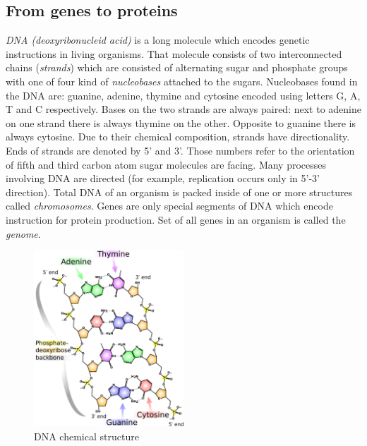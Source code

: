 \documentclass[times, utf8, diplomski]{fer}
\begin{document}
\subsection{From genes to proteins}

\emph{DNA (deoxyribonucleid acid)} is a long molecule which encodes genetic instructions in living organisms. That molecule consists of two interconnected chains (\emph{strands}) which are consisted of alternating sugar and phosphate groups with one of four kind of \emph{nucleobases} attached to the sugars. Nucleobases found in the DNA are: guanine, adenine, thymine and cytosine encoded using letters G, A, T and C respectively. Bases on the two strands are always paired: next to adenine on one strand there is always thymine on the other. Opposite to guanine there is always cytosine. Due to their chemical composition, strands have directionality. Ends of strands are denoted by 5' and 3'. Those numbers refer to the orientation of fifth and third carbon atom sugar molecules are facing. Many processes involving DNA are directed (for example, replication occurs only in 5'-3' direction). Total DNA of an organism is packed inside of one or more structures called \emph{chromosomes}. Genes are only special segments of DNA which encode instruction for protein production. Set of all genes in an organism is called the \emph{genome}.
\\

\begin{figure}[!ht]
\begin{center}
	\includegraphics[width=0.5\textwidth]{../img/DNA_chemical_structure.pdf}
	\caption{DNA chemical structure\protect\cite{dna.chemical.structure.img}}\label{dna.chemical.structure}
\end{center}
\end{figure}
\end{document}
